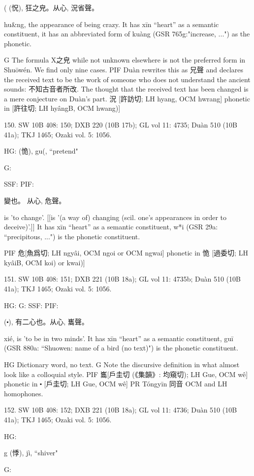 ( (怳),
狂之皃。从心,
況省聲。


hu&ng,
the appearance of being crazy.
It has xīn ``heart'' as a semantic constituent,
it has an abbreviated form of kuàng (GSR 765g:"increase, ...") as the phonetic.

G The formula X之皃 while not unknown elsewhere is not the preferred form in Shuōwén. We find only nine cases.
PIF Duàn rewrites this as 兄聲 and declares the received text to be the work of someone who does not understand the ancient sounds: 不知古音者所改. The thought that the received text has been changed is a mere conjecture on Duàn's part.
況 [許訪切; LH hyang, OCM hwrang] phonetic in [許往切; LH hyângB, OCM hwang)]

150. SW 10B 408: 150; DXB 220 (10B 17b); GL vol 11: 4735; Duàn 510 (10B 41a); TKJ 1465; Ozaki vol. 5: 1056.

HG:	(恑),      gu(, ``pretend"




G:

SSF: PIF:

變也。
从心, 危聲。

is 'to change'. [[is '(a way of) changing (scil. one's appearances in order to deceive)'.]]
It has xīn ``heart'' as a semantic constituent,
w*i (GSR 29a: ``precipitous, ...") is the phonetic constituent.

PIF     危[魚爲切; LH ngyâi, OCM ngoi or OCM ngwai] phonetic in 恑 [過委切; LH kyâiB, OCM koi) or kwai)]


151. SW 10B 408: 151; DXB 221 (10B 18a); GL vol 11: 4735b; Duàn 510 (10B 41a); TKJ 1465; Ozaki vol. 5: 1056.


HG:
G: SSF: PIF:

(⬝),
有二心也。从心,
巂聲。

xié,
is 'to be in two minds'.
It has xīn ``heart'' as a semantic constituent,
guī (GSR 880a: ``Shuowen: name of a bird (no text)") is the phonetic constituent.

HG Dictionary word, no text.
G	Note the discursive definition in what almost look like a colloquial style.
PIF     巂[戶圭切 (《集韻》: 均窺切); LH Gue, OCM wê] phonetic in ⬝ [戶圭切; LH Gue, OCM wê]
PR	Tóngyīn 同音 OCM and LH homophones.

152. SW 10B 408: 152; DXB 221 (10B 18a); GL vol 11: 4736; Duàn 510 (10B 41a); TKJ 1465; Ozaki vol. 5: 1056.


HG:

g (悸), jì, ``shiver"

G:

